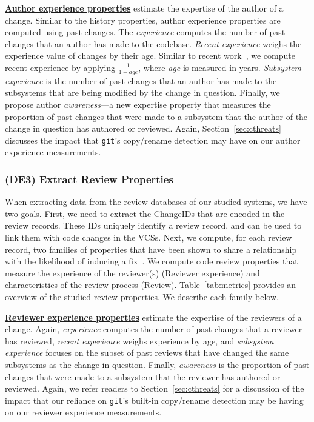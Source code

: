 \underline{\bf Author experience properties} estimate the expertise of the author of a change.
Similar to the history properties, author experience properties are computed using past changes.
The {\em experience} computes the number of past changes that an author has made to the codebase.
{\em Recent experience} weighs the experience value of changes by their age.
Similar to recent work~\cite{kamei2013tse}, we compute recent experience by applying $\frac{1}{1+\textit{age}}$, where {\em age} is measured in years.
{\em Subsystem experience} is the number of past changes that an author has made to the subsystems that are being modified by the change in question.
Finally, we propose author {\em awareness}---a new expertise property that measures the proportion of past changes that were made to a subsystem that the author of the change in question has authored or reviewed.
Again, Section~\ref{sec:cthreats} discusses the impact that {\tt git}'s copy/rename detection may have on our author experience measurements.

\subsubsection*{(DE3) Extract Review Properties}
When extracting data from the review databases of our studied systems, we have two goals.
First, we need to extract the ChangeIDs that are encoded in the review records.
These IDs uniquely identify a review record, and can be used to link them with code changes in the VCSs.
Next, we compute, for each review record, two families of properties that have been shown to share a relationship with the likelihood of inducing a fix~\cite{kononenko2015icsme,thongtanunam2015msr}.
We compute code review properties that measure the experience of the reviewer(s) (Reviewer experience) and characteristics of the review process (Review).
Table~\ref{tab:metrics} provides an overview of the studied review properties.
We describe each family below.

\underline{\bf Reviewer experience properties} estimate the expertise of the reviewers of a change.
Again, {\em experience} computes the number of past changes that a reviewer has reviewed,
{\em recent experience} weighs experience by age, and {\em subsystem experience} focuses on the subset of past reviews that have changed the same subsystems as the change in question.
Finally, {\em awareness} is the proportion of past changes that were made to a subsystem that the reviewer has authored or reviewed.
Again, we refer readers to Section~\ref{sec:cthreats} for a discussion of the impact that our reliance on {\tt git}'s built-in copy/rename detection may be having on our reviewer experience measurements.

